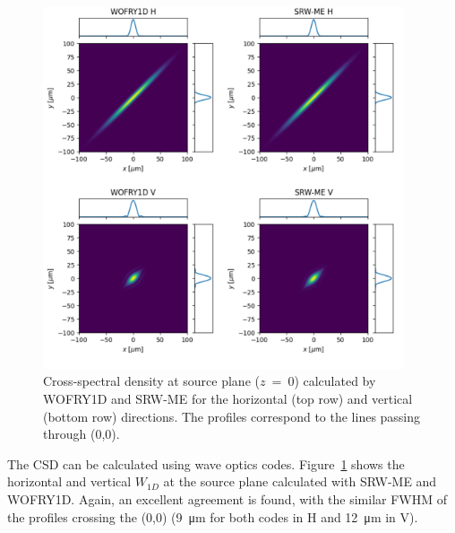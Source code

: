 \documentclass{iucr}
\newcommand{\inblue}[1]{{\color{blue}#1}}
\begin{document}
\begin{figure}
    \label{fig:plot_CSD_at_source}
    \includegraphics[width=0.95\textwidth]{figures/plot_CSD_at_source.pdf}
    \caption{Cross-spectral density at source plane ($z$~=~0) calculated by WOFRY1D and SRW-ME for the horizontal (top row) and vertical (bottom row) directions.
    The profiles correspond to the lines passing through (0,0).
    }
\end{figure}

The CSD can be calculated using wave optics codes. 
\inblue{Figure~\ref{fig:plot_CSD_at_source}} shows the horizontal and vertical $W_{1D}$ at the source plane calculated with SRW-ME and WOFRY1D.
Again, an excellent agreement is found, with the similar FWHM of the profiles crossing the (0,0) (\SI{9}{\micro\meter} for both codes in H and \SI{12}{\micro\meter} in V).
\end{document}
